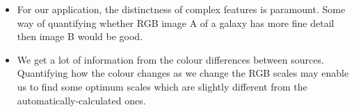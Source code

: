 \documentclass[letterpaper, 11pt]{article}
\begin{document}
\begin{itemize}
	\item For our application, the distinctness of complex features is paramount. Some way of quantifying whether RGB image A of a galaxy has more fine detail then image B would be good.
	
	\item We get a lot of information from the colour differences between sources. Quantifying how the colour changes as we change the RGB scales may enable us to find some optimum scales which are slightly different from the automatically-calculated ones.
\end{itemize}

\end{document}

